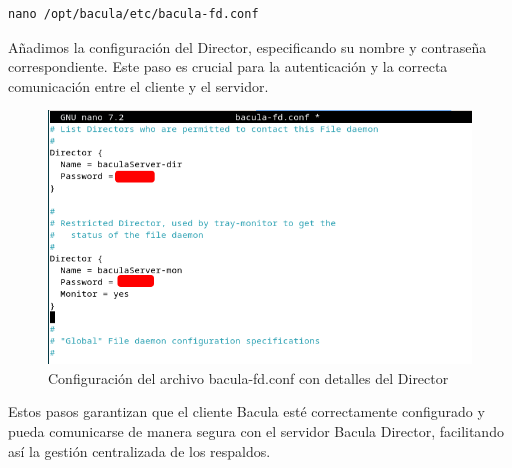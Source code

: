 \begin{verbatim}
nano /opt/bacula/etc/bacula-fd.conf
\end{verbatim}

Añadimos la configuración del Director, especificando su nombre y contraseña correspondiente. Este paso es crucial para la autenticación y la correcta comunicación entre el cliente y el servidor.

\begin{figure}[H]
    \centering
    \includegraphics[width=0.5\linewidth]{instalacionBacula/baculaFDcongf.png}
    \caption{Configuración del archivo bacula-fd.conf con detalles del Director}
\end{figure}

Estos pasos garantizan que el cliente Bacula esté correctamente configurado y pueda comunicarse de manera segura con el servidor Bacula Director, facilitando así la gestión centralizada de los respaldos.
